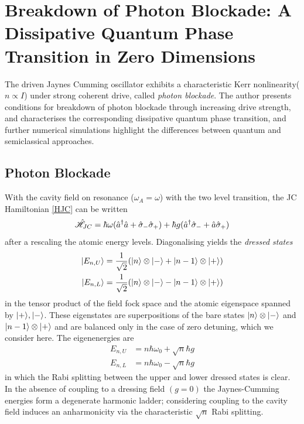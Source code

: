 
\section{Breakdown of Photon Blockade: A Dissipative Quantum Phase Transition in Zero Dimensions}
The driven Jaynes Cumming oscillator exhibits a characteristic Kerr nonlinearity($n \propto I$) under strong coherent drive, called \emph{photon blockade}\autocite{Carmichael2015}. The author presents conditions for breakdown of photon blockade through increasing drive strength, and characterises the corresponding dissipative quantum phase transition, and further numerical simulations highlight the differences between quantum and semiclassical approaches.
\subsection{Photon Blockade}
With the cavity field on resonance ($\omega_A = \omega$) with the two level transition, the JC Hamiltonian \cref{HJC} can be written\autocite[3]{Carmichael2015}
\begin{equation}
	\hat{\mathscr{H}}_{JC} = \hbar \omega (\hat{a}^\dagger \hat{a} + \hat{\sigma}_- \hat{\sigma}_+) +\hbar g (\hat{a}^\dagger \hat{\sigma}_- + \hat{a} \hat{\sigma}_+)
\end{equation}
after a rescaling the atomic energy levels. Diagonalising yields the \emph{dressed states}
\begin{align}
	| E_{n, U} \rangle & = \frac{1}{\sqrt{2}} (| n \rangle \otimes | - \rangle+| n-1 \rangle \otimes | + \rangle) \\
	| E_{n, L} \rangle & = \frac{1}{\sqrt{2}} (| n \rangle \otimes | - \rangle-| n-1 \rangle \otimes | + \rangle)
\end{align} 
in the tensor product of the field fock space and the atomic eigenspace spanned by $| + \rangle, | - \rangle$. These eigenstates are superpositions of the bare states $| n \rangle \otimes | - \rangle$ and $| n-1 \rangle \otimes | + \rangle$ and are balanced only in the case of zero detuning, which we consider here. The eigenenergies are 
\begin{align}
	E_{n, U} &= n \hbar \omega_0 + \sqrt{n} \hbar g \\
	E_{n, L} &= n \hbar \omega_0 - \sqrt{n} \hbar g
\end{align}
in which the Rabi splitting between the upper and lower dressed states is clear. In the absence of coupling to a dressing field $(g=0)$ the Jaynes-Cumming energies form a degenerate harmonic ladder; considering coupling to the cavity field induces an anharmonicity via the characteristic $\sqrt{n}$ Rabi splitting.

